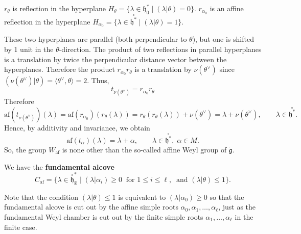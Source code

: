 \documentclass[12pt]{article}
\begin{document}
$r_\theta$ is reflection in the hyperplane $H_\theta = \{\lambda \in \mathfrak{h}_0^* \mid (\lambda|\theta)=0\}$. $r_{\alpha_0}$ is an affine reflection in the hyperplane $H_{\alpha_0} = \{\lambda \in \overset{\circ}{\mathfrak{h}^*} \mid (\lambda|\theta)=1\}$.

These two hyperplanes are parallel (both perpendicular to $ \theta $), but one is shifted by 1 unit in the $\theta$-direction. The product of two reflections in parallel hyperplanes is a translation by twice the perpendicular distance vector between the hyperplanes. Therefore the product $r_{\alpha_0} r_\theta$ is a translation by $\nu(\theta^\vee)$ since $(\nu(\theta^\vee)|\theta) = \langle \theta^\vee, \theta \rangle = 2$. Thus,
\[t_{\nu(\theta^\vee)} = r_{\alpha_0} r_\theta\]
Therefore
\[
    \mathrm{af}(t_{\nu(\theta^\vee)})(\lambda) 
    = \mathrm{af}(r_{\alpha_0})(r_\theta(\lambda)) = r_\theta(r_\theta(\lambda)) + \nu(\theta^\vee)
    = \lambda + \nu(\theta^\vee), \qquad \lambda \in \overset{\circ}{\mathfrak{h}^*}.
\]
Hence, by additivity and invariance, we obtain
\begin{equation} \label{6.6.3}
    \mathrm{af}(t_\alpha)(\lambda) = \lambda + \alpha, 
    \qquad \lambda \in \overset{\circ}{\mathfrak{h}^*}, \; \alpha \in M.
\end{equation}
So, the group $W_{\mathrm{af}}$ is none other than the so-called affine Weyl group of $\dot{\mathfrak{g}}$.

\begin{definition}
We have the \textbf{fundamental alcove}
\[
C_{\mathrm{af}} = \{ \lambda \in \overset{\circ}{\mathfrak{h}}^*_{\mathbb{R}} \mid 
(\lambda|\alpha_i) \geq 0 \;\; \text{for } 1 \leq i \leq \ell,\;\; 
\text{and } (\lambda|\theta) \leq 1 \}.
\]
\end{definition}
Note that the condition $(\lambda | \theta ) \leq 1$ is equivalent to $(\lambda | \alpha_0) \geq 0$ so that the fundamental alcove is cut out by the affine simple roots $\alpha_0, \alpha_1, \ldots, \alpha_\ell$, just as the fundamental Weyl chamber is cut out by the finite simple roots $\alpha_1, \ldots, \alpha_\ell$ in the finite case.
\end{document}
